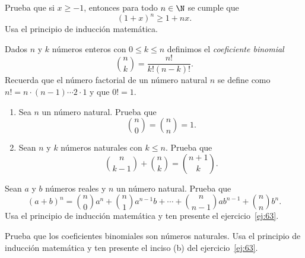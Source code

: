\documentclass[12pt,a4paper]{book}
\begin{document}
    \begin{ejercicio}\label{ej:62}
        Prueba que si $x\geq -1$, entonces
        para todo $n\in\N$ se cumple que
        \begin{equation*}
            (1+x)^{n}\geq 1+nx.
        \end{equation*}
        \sugerencia Usa el principio de inducción matemática.
    \end{ejercicio}

    \begin{ejercicio}\label{ej:63}
        Dados $n$ y $k$ números enteros con
        $0\leq k\leq n$ definimos el \textit{coeficiente binomial}
        \begin{equation*}
            \binom{n}{k}=\frac{n!}{k!(n-k)!}.
        \end{equation*}
        Recuerda que el número factorial de un número natural $n$ se define como
        $n!=n\cdot(n-1)\cdots 2\cdot 1$ y que $0!=1$.
        \begin{enumerate}
            \item Sea $n$ un número natural. Prueba que
            \begin{equation*}
                \binom{n}{0}=\binom{n}{n}=1.
            \end{equation*}
            \item Sean $n$ y $k$ números naturales con $k\leq n$. Prueba que
            \begin{equation*}
                \binom{n}{k-1}+\binom{n}{k}=\binom{n+1}{k}.
            \end{equation*}
        \end{enumerate}
    \end{ejercicio}

    \begin{ejercicio}\label{ej:64}
        Sean $a$ y $b$ números reales y $n$ un
        número natural. Prueba que
        \begin{equation*}
            (a+b)^{n}=\binom{n}{0}a^{n}+\binom{n}{1}a^{n-1}b+\cdots+\binom{n}{n-1}ab^{n-1}+\binom{n}{n}b^{n}.
        \end{equation*}
        \sugerencia Usa el principio de inducción matemática y ten presente el
        ejercicio~\ref{ej:63}.
    \end{ejercicio}

    \begin{ejercicio}\label{ej:65}
        Prueba que los coeficientes binomiales son números naturales.
        \sugerencia Usa el principio de inducción matemática y ten presente el
        inciso (b) del ejercicio~\ref{ej:63}.
    \end{ejercicio}
\end{document}

